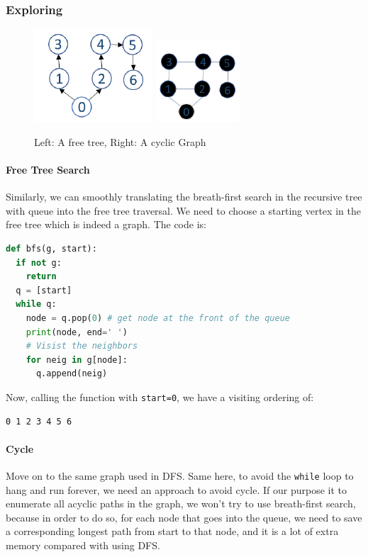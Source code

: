 \documentclass[main.tex]{subfiles}
\begin{document}
\subsubsection{Exploring} 
\begin{figure}[!ht]
    \centering
    \includegraphics[width=0.4\columnwidth]{fig/bfs_free_tree.png}
     \includegraphics[width=0.4\columnwidth]{fig/cyclic_graph_searching.png}
    \caption{Left: A free tree, Right: A cyclic Graph}
    \label{fig:cyclic_graph_search_bfs}
\end{figure}
\paragraph{Free Tree Search} Similarly, we can smoothly translating the breath-first search in the recursive tree with queue into the free tree traversal. We need to choose a starting vertex in the free tree which is indeed a graph. The code is:
\begin{lstlisting}[language=Python]
def bfs(g, start):
  if not g:
    return 
  q = [start]
  while q:
    node = q.pop(0) # get node at the front of the queue
    print(node, end=' ')
    # Visist the neighbors
    for neig in g[node]:
      q.append(neig)
\end{lstlisting}
Now, calling the function with \texttt{start=0}, we have a visiting ordering of:
\begin{lstlisting}[numbers=none]
0 1 2 3 4 5 6 
\end{lstlisting}
\paragraph{Cycle} Move on to the same graph used in DFS. Same here, to avoid the \texttt{while} loop to hang and run forever, we need an approach to avoid cycle. If our purpose it to enumerate all acyclic paths in the graph, we won't try to use breath-first search, because in order to do so, for each node that goes into the queue, we need to save a corresponding longest path from start to that node, and it is a lot of extra memory compared with using DFS. 
\end{document}
